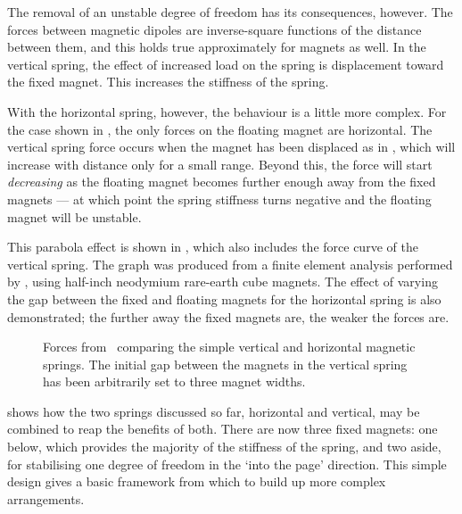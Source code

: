 The removal of an unstable degree of freedom has its consequences,
however.  The forces between magnetic dipoles are inverse-square
functions of the distance between them, and this holds true
approximately for magnets as well. In the vertical spring, the effect
of increased load on the spring is displacement toward the fixed
magnet. This increases the stiffness of the spring.

With the horizontal spring, however, the behaviour is a little more
complex. For the case shown in , the only forces
on the floating magnet are horizontal. The vertical spring force
occurs when the magnet has been displaced as in ,
which will increase with distance only for a small range. Beyond this,
the force will start \emph{decreasing} as the floating magnet becomes
further enough away from the fixed magnets — at which point the spring
stiffness turns negative and the floating magnet will be unstable.

This parabola effect is shown in , which also
includes the force curve of the vertical spring. The graph was
produced from a finite element analysis performed by \ANSYS, using
half-inch neodymium rare-earth cube magnets.
The effect of varying the gap between the fixed and floating magnets for the 
horizontal spring is also demonstrated; the further away the fixed magnets 
are, the weaker the forces are.

\begin{figure}
  \begin{wide}
    \raggedout
    \hfill
    \hfill
    \null
  \end{wide}
  \caption[Spring forces of the vertical \& horizontal springs.]{Forces from
\FEA\ comparing the simple vertical and horizontal magnetic springs.
The initial gap between the magnets in the vertical spring has been arbitrarily
set to three magnet widths.}
\end{figure}

 shows how the two springs discussed so far,
horizontal and vertical, may be combined to reap the benefits of
both. There are now three fixed magnets: one below, which provides the
majority of the stiffness of the spring, and two aside, for
stabilising one degree of freedom in the `into the page'
direction. This simple design gives a basic framework from which to
build up more complex arrangements.

